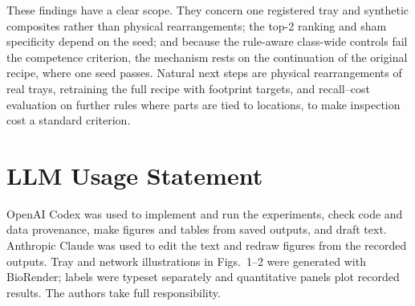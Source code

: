\documentclass[10pt,twocolumn,letterpaper]{article}
\begin{document}
These findings have a clear scope. They concern one registered tray and synthetic composites rather than physical rearrangements; the top-2 ranking and sham specificity depend on the seed; and because the rule-aware class-wide controls fail the competence criterion, the mechanism rests on the continuation of the original recipe, where one seed passes. Natural next steps are physical rearrangements of real trays, retraining the full recipe with footprint targets, and recall--cost evaluation on further rules where parts are tied to locations, to make inspection cost a standard criterion.

\section*{LLM Usage Statement}
OpenAI Codex was used to implement and run the experiments, check code and data provenance, make figures and tables from saved outputs, and draft text. Anthropic Claude was used to edit the text and redraw figures from the recorded outputs. Tray and network illustrations in Figs.~1--2 were generated with BioRender; labels were typeset separately and quantitative panels plot recorded results. The authors take full responsibility.

{\small


}
\end{document}
